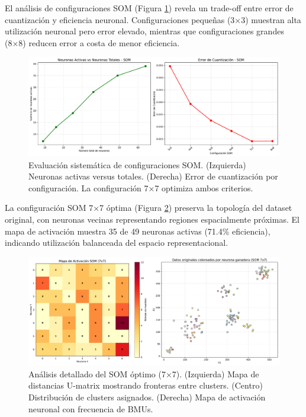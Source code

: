 \documentclass[12pt,a4paper]{article}
\begin{document}
El análisis de configuraciones SOM (Figura \ref{fig:som_configuraciones}) revela un trade-off entre error de cuantización y eficiencia neuronal. Configuraciones pequeñas (3×3) muestran alta utilización neuronal pero error elevado, mientras que configuraciones grandes (8×8) reducen error a costa de menor eficiencia.

\begin{figure}[H]
    \centering
    \includegraphics[width=\textwidth]{figures/figura_04_analisis_som_configuraciones.pdf}
    \caption{Evaluación sistemática de configuraciones SOM. (Izquierda) Neuronas activas versus totales. (Derecha) Error de cuantización por configuración. La configuración 7×7 optimiza ambos criterios.}
    \label{fig:som_configuraciones}
\end{figure}

La configuración SOM 7×7 óptima (Figura \ref{fig:som_optimo}) preserva la topología del dataset original, con neuronas vecinas representando regiones espacialmente próximas. El mapa de activación muestra 35 de 49 neuronas activas (71.4\% eficiencia), indicando utilización balanceada del espacio representacional.

\begin{figure}[H]
    \centering
    \includegraphics[width=\textwidth]{figures/figura_05_som_optimo_detallado.pdf}
    \caption{Análisis detallado del SOM óptimo (7×7). (Izquierda) Mapa de distancias U-matrix mostrando fronteras entre clusters. (Centro) Distribución de clusters asignados. (Derecha) Mapa de activación neuronal con frecuencia de BMUs.}
    \label{fig:som_optimo}
\end{figure}
\end{document}
